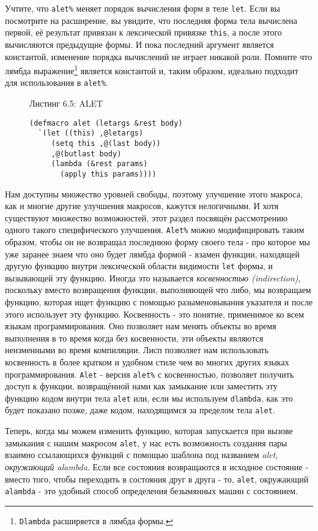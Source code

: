 Учтите, что \verb"alet%" меняет порядок вычисления форм в теле \verb"let". Если вы посмотрите на расширение, вы увидите, что последняя форма тела вычислена первой, её результат привязан к лексической привязке \verb"this", а после этого вычисляются предыдущие формы. И пока последний аргумент является константой, изменение порядка вычислений не играет никакой роли. Помните что лямбда выражение\footnote{\verb"Dlambda" расширяется в лямбда формы.} является константой и, таким образом, идеально подходит для использования в \verb"alet%".



\begin{figure}Листинг 6.5: ALET\label{listing_6.5}
\listbegin
\begin{verbatim}
(defmacro alet (letargs &rest body)
  `(let ((this) ,@letargs)
     (setq this ,@(last body))
     ,@(butlast body)
     (lambda (&rest params)
       (apply this params))))
\end{verbatim}
\listend
\end{figure}

Нам доступны множество уровней свободы, поэтому улучшение этого макроса, как и многие другие улучшения макросов, кажутся нелогичными. И хотя существуют множество возможностей, этот раздел посвящён рассмотрению одного такого специфического улучшения. \verb"Alet%" можно модифицировать таким образом, чтобы он не возвращал последнюю форму своего тела - про которое мы уже заранее знаем что оно будет лямбда формой - взамен функции, находящей другую функцию внутри лексической области видимости \verb"let" формы, и вызывающей эту функцию. Иногда это называется \emph{косвенностью (indirection)}, поскольку вместо возвращения функции, выполняющей что либо, мы возвращаем функцию, которая ищет функцию с помощью разыменовывания указателя и после этого использует эту функцию. Косвенность - это понятие, применимое ко всем языкам программирования. Оно позволяет нам менять объекты во время выполнения в то время когда без косвенности, эти объекты являются неизменными во время компиляции. Лисп позволяет нам использовать косвенность в более кратком и удобном стиле чем во многих других языках программирования. \verb"Alet" - версия \verb"alet%" с косвенностью, позволяет получить доступ к функции, возвращённой нами как замыкание или заместить эту функцию кодом внутри тела \verb"alet" или, если мы используем \verb"dlambda", как это будет показано позже, даже кодом, находящимся за пределом тела \verb"alet".

Теперь, когда мы можем изменить функцию, которая запускается при вызове замыкания с нашим макросом \verb"alet", у нас есть возможность создания пары взаимно ссылающихся функций с помощью шаблона под названием \emph{alet, окружающий alambda}. Если все состояния возвращаются в исходное состояние - вместо того, чтобы переходить в состояния друг в друга - то, \verb"alet", окружающий \verb"alambda" - это удобный способ определения безымянных машин с состоянием.

